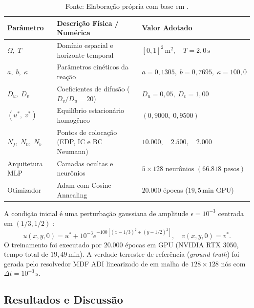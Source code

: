 \documentclass[a4paper, 12pt, twoside]{article}
\begin{document}
\begin{table}[ht]
\caption{Parâmetros físicos, dimensionais e hiperparâmetros de rede adotados conforme \textcite{pereira2019}.}
\label{tab:parametros}
\centering
\footnotesize
\setlength{\tabcolsep}{2.5pt}
\begin{tabular}{p{2.2cm}p{8.0cm}p{4.8cm}}
\toprule
\textbf{Parâmetro} & \textbf{Descrição Física / Numérica} & \textbf{Valor Adotado} \\
\midrule
$\Omega, \; T$ & Domínio espacial e horizonte temporal & $[0, 1]^2\,\text{m}^2, \quad T = 2{,}0\,\text{s}$ \\
$a, \; b, \; \kappa$ & Parâmetros cinéticos da reação & $a = 0{,}1305, \; b = 0{,}7695, \; \kappa = 100{,}0$ \\
$D_u, \; D_v$ & Coeficientes de difusão ($D_v/D_u = 20$) & $D_u = 0{,}05, \; D_v = 1{,}00$ \\
$(u^*, \; v^*)$ & Equilíbrio estacionário homogêneo & $(0{,}9000, \; 0{,}9500)$ \\
$N_f, \; N_0, \; N_b$ & Pontos de colocação (EDP, IC e BC Neumann) & $10.000, \quad 2.500, \quad 2.000$ \\
Arquitetura MLP & Camadas ocultas e neurônios & $5 \times 128 \text{ neurônios } (66.818 \text{ pesos})$ \\
Otimizador & Adam com Cosine Annealing & $20.000$ épocas ($19{,}5$\,min GPU) \\
\bottomrule
\end{tabular}
\caption*{Fonte: Elaboração própria com base em \textcite{pereira2019}.}
\end{table}

A condição inicial é uma perturbação gaussiana de amplitude $\epsilon = 10^{-3}$ centrada em $(1/3, 1/2)$ \parencite{pereira2019}:
\begin{equation}
  u(x, y, 0) = u^* + 10^{-3} e^{-100\left[(x - 1/3)^2 + (y - 1/2)^2\right]}, \quad v(x, y, 0) = v^*. \label{eq:ic_gauss}
\end{equation}
O treinamento foi executado por $20.000$ épocas em GPU (NVIDIA RTX 3050, tempo total de $19{,}49$\,min). A verdade terrestre de referência (\textit{ground truth}) foi gerada pelo resolvedor MDF ADI linearizado de \textcite{pereira2019} em malha de $128 \times 128$ nós com $\Delta t = 10^{-3}\,\text{s}$.

\subsection{Resultados e Discussão}
\end{document}
